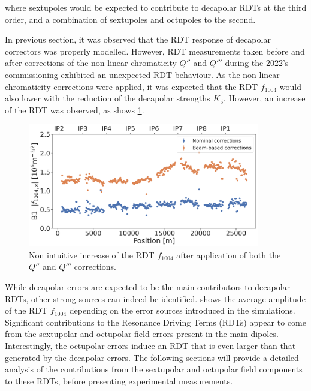 where sextupoles would be expected to contribute to decapolar RDTs at the third order, and a
combination of sextupoles and octupoles to the second.

In previous section, it was observed that the RDT response of decapolar correctors was properly
modelled. However, RDT measurements taken before and after corrections of the non-linear
chromaticity $Q''$ and $Q'''$ during the 2022's commissioning exhibited an unexpected RDT behaviour.
As the non-linear chromaticity corrections were applied, it was expected that the RDT $f_{1004}$
would also lower with the reduction of the decapolar strengths $K_5$. However, an increase of the
RDT was observed, as shows \cref{fig:decapoles:f1004_dq2_dq3}.

\begin{figure}[H]
    \centering
    \includegraphics[width=0.9\textwidth]{./images/f1004_dq2_dq3_2022.pdf}    
    \caption{Non intuitive increase of the RDT $f_{1004}$ after application of both the $Q''$ and
    $Q'''$ corrections.}
    \label{fig:decapoles:f1004_dq2_dq3}
\end{figure}


While decapolar errors are expected to be the main contributors to decapolar RDTs, other strong
sources can indeed be identified.  shows the average
amplitude of the RDT $f_{1004}$ depending on the error sources introduced in the simulations. 
Significant contributions to the Resonance Driving Terms (RDTs) appear to come from the sextupolar
and octupolar field errors present in the main dipoles. Interestingly, the octupolar errors induce
an RDT that is even larger than that generated by the decapolar errors. 
The following sections will provide a detailed analysis of the contributions from the sextupolar and
octupolar field components to these RDTs, before presenting experimental measurements.

